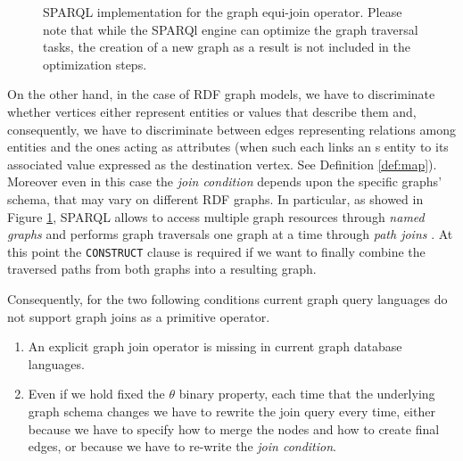 \begin{description}
	\begin{figure}[!p]
	    \begin{minipage}[t]{\textwidth}
	      
	      \caption{SPARQL implementation for the graph equi-join operator. Please note that while the SPARQl engine can optimize the graph traversal tasks, the creation of a new graph as a result is not included in the optimization steps.}
	      \label{fig:SparqlEquiJoin}
	    \end{minipage}
	\end{figure}
	On the other hand, in the case of RDF graph models, we have to discriminate whether vertices either represent entities or
	values that describe them and, consequently, we have to discriminate between edges representing
	relations among entities and the ones  acting as  attributes (when such each links an s entity to its associated value
	expressed as the destination vertex. See Definition \vref{def:map}).
	Moreover even in this case the \textit{join condition} depends upon the specific graphs' schema,
	that may vary on different RDF graphs. In particular, as showed in Figure \ref{fig:SparqlEquiJoin}, SPARQL allows to access multiple graph resources
	through \textit{named graphs} and performs graph traversals one graph at a time through
	\textit{path joins} \cite{Fletcher09,Atre,Yuan}.
	At this point the \texttt{CONSTRUCT} clause is required if we
	want to finally combine the traversed paths from both graphs into a resulting graph.

	Consequently, for the two following conditions current graph query languages do not support
	graph joins as a primitive operator.
	\begin{enumerate}
		\item An explicit graph join operator is missing in current graph database languages.
		\item Even if we hold fixed the $\theta$ binary property, each time that the underlying graph schema
		changes we have to rewrite the join query every time, either because we have to specify how to merge
		the nodes and how to create final edges, or because we have to re-write the \textit{join condition}.
	\end{enumerate}
\end{description}

